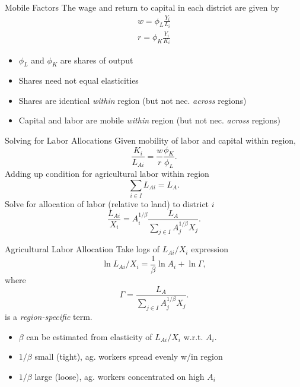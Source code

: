 \documentclass[10pt, xcolor=dvipsnames]{beamer}
\begin{document}
\begin{frame}{Mobile Factors}
The wage and return to capital in each district are given by 
\begin{eqnarray}
    w = \phi_L \frac{Y_i}{L_i} \\ \nonumber
    r = \phi_K \frac{Y_i}{K_i} \label{EQ_factorprices}
\end{eqnarray}
\begin{itemize}
  \item $\phi_L$ and $\phi_K$ are shares of output 
  \item Shares need not equal elasticities
  \item Shares are identical \textit{within} region (but not nec. \textit{across} regions)
  \item Capital and labor are mobile \textit{within} region (but not nec. \textit{across} regions)
\end{itemize}
\end{frame}

\begin{frame}{Solving for Labor Allocations}
Given mobility of labor and capital within region,
\begin{equation}
    \frac{K_i}{L_{Ai}} = \frac{w}{r}\frac{\phi_K}{\phi_L}.
\end{equation}
Adding up condition for agricultural labor within region
\begin{equation}
\sum_{i\in I} L_{Ai} = L_A.
\end{equation}
Solve for allocation of labor (relative to land) to district $i$
\begin{equation}
\frac{L_{Ai}}{X_i} = A_{i}^{1/\beta}\frac{L_A}{\sum_{j\in I} A_{j}^{1/\beta}X_{j}}. \label{EQ_LaX}
\end{equation}
\end{frame}

\begin{frame}{Agricultural Labor Allocation}
Take logs of $L_{Ai}/X_i$ expression
\begin{equation}
\ln L_{Ai}/X_i = \frac{1}{\beta} \ln A_{i} + \ln \Gamma, \label{EQ_est}
\end{equation}
where
\begin{equation}
    \Gamma = \frac{L_A}{\sum_{j\in I} A_{j}^{1/\beta}X_{j}}.
\end{equation}
is a \textit{region-specific} term. 

\begin{itemize}
  \item $\beta$ can be estimated from elasticity of $L_{Ai}/X_i$ w.r.t. $A_i$. 
  \item $1/\beta$ small (tight), ag. workers spread evenly w/in region
  \item $1/\beta$ large (loose), ag. workers concentrated on high $A_i$
\end{itemize}
\end{frame}
\end{document}
